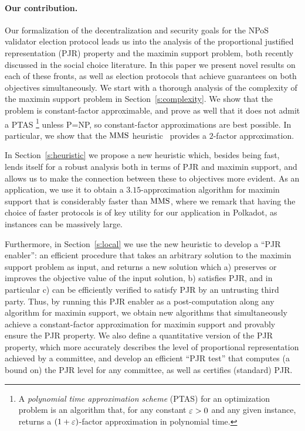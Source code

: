 \paragraph{Our contribution.}
Our formalization of the decentralization and security goals for the NPoS validator election protocol leads us into the analysis of the proportional justified representation (PJR) property and the maximin support problem, both recently discussed in the social choice literature. In this paper we present novel results on each of these fronts, as well as election protocols that achieve guarantees on both objectives simultaneously.
%
We start with a thorough analysis of the complexity of the maximin support problem in Section~\ref{s:complexity}. We show that the problem is constant-factor approximable, and prove as well that it does not admit a PTAS%
    \footnote{A \emph{polynomial time approximation scheme} (PTAS) for an optimization problem is an algorithm that, for any constant $\varepsilon>0$ and any given instance, returns a $(1+\varepsilon)$-factor approximation in polynomial time.}%
unless P=NP, so constant-factor approximations are best possible. In particular, we show that the $\operatorname{MMS}$ heuristic~\cite{sanchez2016maximin} provides a $2$-factor approximation. 

In Section~\ref{s:heuristic} we propose a new heuristic which, besides being fast, lends itself for a robust analysis both in terms of PJR and maximin support, and allows us to make the connection between these to objectives more evident. As an application, we use it to obtain a $3.15$-approximation algorithm for maximin support that is considerably faster than $\operatorname{MMS}$, where we remark that having the choice of faster protocols is of key utility for our application in Polkadot, as instances can be massively large. 

Furthermore, in Section~\ref{s:local} we use the new heuristic to develop a ``PJR enabler'': an efficient procedure that takes an arbitrary solution to the maximin support problem as input, and returns a new solution which a) preserves or improves the objective value of the input solution,  b) satisfies PJR, and in particular c) can be efficiently verified to satisfy PJR by an untrusting third party. Thus, by running this PJR enabler as a post-computation along any algorithm for maximin support, we obtain new algorithms that simultaneously achieve a constant-factor approximation for maximin support and provably ensure the PJR property. We also define a quantitative version of the PJR property, which more accurately describes the level of proportional representation achieved by a committee, and develop an efficient ``PJR test'' that computes (a bound on) the PJR level for any committee, as well as certifies (standard) PJR. 

